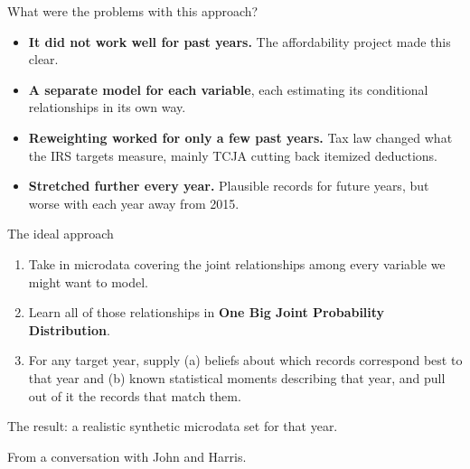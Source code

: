 \documentclass[11pt,aspectratio=169]{beamer}
\newcommand{\slidenote}[1]{\par\vfill{\scriptsize\color{yalegrey}#1}}
\begin{document}
\begin{frame}{What were the problems with this approach?}
  \begin{itemize}
    \item \textbf{It did not work well for past years.} The affordability project made this clear.
    \vspace{0.6em}
    \item \textbf{A separate model for each variable}, each estimating its conditional
          relationships in its own way.
    \vspace{0.6em}
    \item \textbf{Reweighting worked for only a few past years.} Tax law changed what the
          IRS targets measure, mainly TCJA cutting back itemized deductions.
    \vspace{0.6em}
    \item \textbf{Stretched further every year.} Plausible records for future years, but
          worse with each year away from 2015.
  \end{itemize}
\end{frame}

\begin{frame}{The ideal approach}
  \begin{enumerate}
    \item Take in microdata covering the joint relationships among every variable we
          might want to model.
    \vspace{0.6em}
    \item Learn all of those relationships in \textbf{One Big Joint Probability Distribution}.
    \vspace{0.6em}
    \item For any target year, supply (a) beliefs about which records correspond best to that
          year and (b) known statistical moments describing that year, and pull out of it the
          records that match them.
  \end{enumerate}
  \vspace{1em}
  The result: a realistic synthetic microdata set for that year.
  \slidenote{From a conversation with John and Harris.}
\end{frame}

\end{document}
